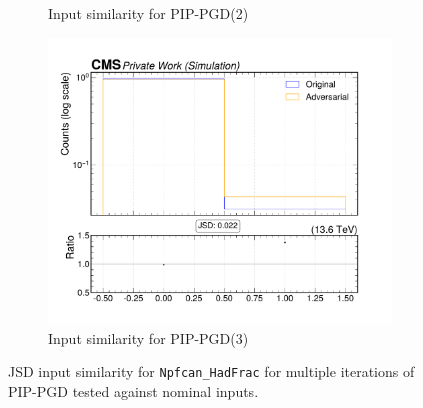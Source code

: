 \begin{figure}[htbp]
\begin{subfigure}[t]{0.32\textwidth}
    \caption*{Input similarity for PIP-PGD(2)}
  \end{subfigure}\hfill
  \begin{subfigure}[t]{0.32\textwidth}
    \includegraphics[width=\linewidth]{media/output/features/compare/combined_it_3/cmp_npf_arr_Npfcan_HadFrac.pdf}
    \caption*{Input similarity for PIP-PGD(3)}
  \end{subfigure}

  \caption*{JSD input similarity for \texttt{Npfcan\_HadFrac} for multiple iterations of PIP-PGD tested against nominal inputs.}
  \label{fig:combined_input_Npfcan_HadFrac}
\end{figure}

